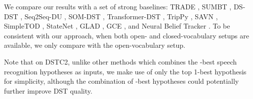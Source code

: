 \documentclass[11pt]{article}
\begin{document}
We compare our results with a set of strong baselines: TRADE \cite{wu-etal-2019-transferable}, SUMBT \cite{lee-etal-2019-sumbt}, DS-DST \cite{zhang2020classify}, Seq2Seq-DU \cite{feng2020sequencetosequence}, SOM-DST \cite{kim-etal-2020-efficient}, Transformer-DST \cite{zeng2021jointly}, TripPy \cite{heck-etal-2020-trippy}, SAVN \cite{wang-etal-2020-slot}, SimpleTOD \cite{hosseiniasl2020simple}, StateNet \cite{ren2018statenet}, GLAD \cite{zhong2018glad}, GCE \cite{nouri2018gce}, and Neural Belief Tracker \cite{mrksic2016nbt}. To be consistent with our approach, when both open- and closed-vocabulary setups are available, we only compare with the open-vocabulary setup.

Note that on DSTC2, unlike other methods which combines the -best speech recognition hypotheses as inputs, we make use of only the top 1-best hypothesis for simplicity, although the combination of -best hypotheses could potentially further improve DST quality.
\end{document}
